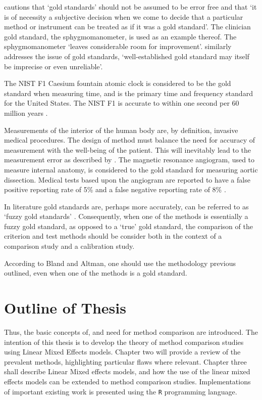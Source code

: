 \documentclass[12pt, a4paper]{report}
\theoremstyle{plain}
\theoremstyle{definition}
\theoremstyle{remark}
\begin{document}
	
		
	\citet[p.47]{DunnSEME} cautions that `gold standards' should not be
	assumed to be error free and that `it is of necessity a subjective
	decision when we come to decide that a particular method or
	instrument can be treated as if it was a gold standard'. The
	clinician gold standard, the sphygmomanometer, is used as an
	example thereof.  The sphygmomanometer `leaves considerable room
	for improvement'. \citet{pizzi} similarly
	addresses the issue of gold standards, `well-established gold
	standard may itself be imprecise or even unreliable'.
	
	
	The NIST F1 Caesium fountain atomic clock is considered to be the
	gold standard when measuring time, and is the primary time and
	frequency standard for the United States. The NIST F1 is accurate
	to within one second per 60 million years \citep{NIST}.
	
	Measurements of the interior of the human body are, by definition,
	invasive medical procedures. The design of method must balance the
	need for accuracy of measurement with the well-being of the
	patient. This will inevitably lead to the measurement error as
	described by \citet{DunnSEME}. The magnetic resonance angiogram,
	used to measure internal anatomy, is considered to the gold
	standard for measuring aortic dissection. Medical tests based upon
	the angiogram are reported to have a false positive reporting rate
	of 5\% and a false negative reporting rate of 8\% \citep{ACR}.
	
	In literature gold standards are, perhaps more accurately, can be referred to as
	`fuzzy gold standards' \citep{phelps}. Consequently, when one of the methods is
	essentially a fuzzy gold standard, as opposed to a `true' gold
	standard, the comparison of the criterion and test methods should
	be consider both in the context of a comparison study and a
	calibration study.
	
	
	
	
	According to Bland and Altman, one should use the methodology
	previous outlined, even when one of the methods is a gold standard.
	
	
	
	
	
	
	
	
	\section{Outline of Thesis}
	Thus, the basic concepts of, and need for method comparison are introduced. The intention of this thesis is to develop the theory of method comparison studies using Linear Mixed Effects models. Chapter two will provide a review of the prevalent methods, highlighting particular flaws where relevant. Chapter three shall describe Linear Mixed effects models, and how the use of the linear mixed
	effects models can be extended to method comparison studies. Implementations of important existing work is presented using the \texttt{R} programming language.
	
\end{document}
